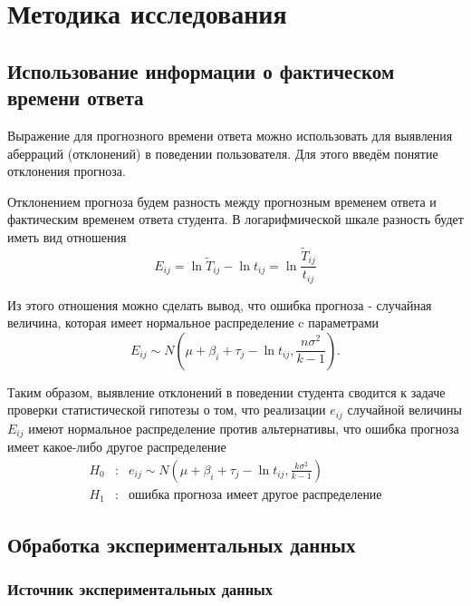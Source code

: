  \chapter{Методика исследования}

 \section{Использование информации о фактическом времени ответа}

Выражение для прогнозного времени ответа можно использовать для вы\-явления абер\-раций (отклонений) в поведении пользователя. Для этого введём понятие отклонения прогноза.

Отклонением прогноза будем разность между прогнозным временем ответа и фактичес\-ким временем ответа студента. В логарифмической шкале разность будет иметь вид отноше\-ния
\begin{equation}
E_{ij} = \ln \tilde{T}_{ij} - \ln t_{ij} =  \ln \frac{\tilde{T}_{ij}}{t_{ij}}
\end{equation}

Из этого отношения можно сделать вывод, что ошибка прогноза - случайная величина, которая имеет нормальное распределение c параметрами
\begin{equation}
E_{ij} \sim N\left(\mu + \beta_i + \tau_j - \ln t_{ij},\frac{n\sigma^2}{k-1}\right).
\end{equation}

Таким образом, выявление отклонений в поведении студента сводится к задаче проверки статистической гипотезы о том, что реализации $e_{ij}$ случайной величины $E_{ij}$ имеют нормаль\-ное распределение против альтернативы, что ошибка прогноза имеет какое-либо другое распреде\-ление
$$
\begin{array}{lll}
H_0 &:& e_{ij} \sim N\left(\mu + \beta_i + \tau_j - \ln t_{ij},\frac{k\sigma^2}{k-1}\right)\\
H_1 &:& \mbox{ошибка прогноза имеет другое распределение}
\end{array}
$$

\section{Обработка экспериментальных данных}

\subsection{Источник экспериментальных данных}

